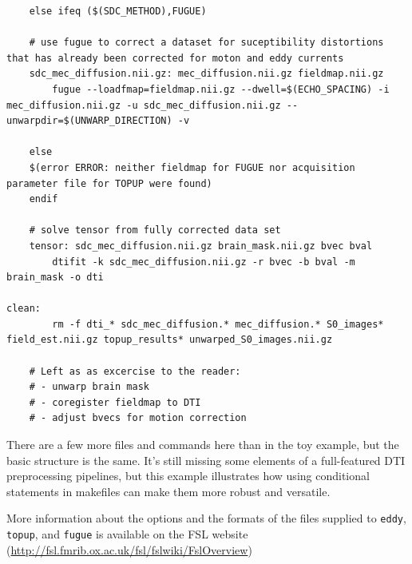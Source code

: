 \begin{lstlisting}
	else ifeq ($(SDC_METHOD),FUGUE)

	# use fugue to correct a dataset for suceptibility distortions that has already been corrected for moton and eddy currents
	sdc_mec_diffusion.nii.gz: mec_diffusion.nii.gz fieldmap.nii.gz
		fugue --loadfmap=fieldmap.nii.gz --dwell=$(ECHO_SPACING) -i mec_diffusion.nii.gz -u sdc_mec_diffusion.nii.gz --unwarpdir=$(UNWARP_DIRECTION) -v

	else
	$(error ERROR: neither fieldmap for FUGUE nor acquisition parameter file for TOPUP were found)
	endif

	# solve tensor from fully corrected data set
	tensor: sdc_mec_diffusion.nii.gz brain_mask.nii.gz bvec bval
		dtifit -k sdc_mec_diffusion.nii.gz -r bvec -b bval -m brain_mask -o dti

clean:
		rm -f dti_* sdc_mec_diffusion.* mec_diffusion.* S0_images* field_est.nii.gz topup_results* unwarped_S0_images.nii.gz

	# Left as as excercise to the reader:
	# - unwarp brain mask
	# - coregister fieldmap to DTI
	# - adjust bvecs for motion correction

\end{lstlisting}

There are a few more files and commands here than in the toy example, but the basic structure is the same. It's still missing some elements of a full-featured DTI preprocessing pipelines, but this example illustrates how using conditional statements in makefiles can make them more robust and versatile. \break

More information about the options and the formats of the files supplied to \texttt{eddy}, \texttt{topup}, and \texttt{fugue} is available on the FSL website (\url{http://fsl.fmrib.ox.ac.uk/fsl/fslwiki/FslOverview})

